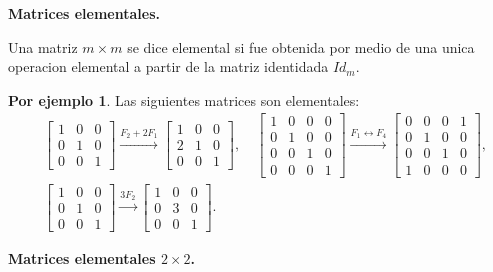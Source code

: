 \documentclass{article}
\theoremstyle{definition}
\theoremstyle{definition}
\newtheorem*{ej}{Por ejemplo}
\theoremstyle{remark}
\begin{document}
\begin{center}
\textbf{Matrices elementales.}
\end{center}
\begin{defi}
  Una matriz $m \times m$ se dice elemental si fue obtenida por medio de una unica operacion elemental a partir de la matriz identidada $Id_m$.
\end{defi}\begin{ej}
Las siguientes matrices son elementales:\[\begin{aligned}
  &\begin{bmatrix} 1 & 0 & 0 \\ 0 & 1 & 0 \\ 0 & 0 & 1 \end{bmatrix} \xrightarrow{F_2+2F_1} \begin{bmatrix}1 & 0 & 0 \\2 & 1 & 0 \\ 0& 0 & 1 \end{bmatrix}, \quad  \begin{bmatrix}1 & 0 & 0 & 0 \\ 0 & 1 & 0 & 0 \\ 0 & 0 & 1 & 0 \\0 & 0 & 0 & 1 \end{bmatrix} \xrightarrow{F_1 \leftrightarrow F_4} \begin{bmatrix}0 & 0 & 0 & 1 \\ 0 & 1 & 0 & 0 \\ 0& 0 & 1 & 0 \\ 1 & 0 & 0 & 0 \end{bmatrix},\\
  &\begin{bmatrix}1 & 0 & 0 \\ 0 & 1 & 0 \\ 0 & 0 & 1 \end{bmatrix} \xrightarrow{3F_2} \begin{bmatrix}1 & 0 & 0 \\ 0 & 3 & 0 \\ 0 & 0 & 1 \end{bmatrix}.
\end{aligned}
 \]\end{ej}
\begin{center}
\textbf{Matrices elementales $2 \times 2$.}
\end{center}
\end{document}
